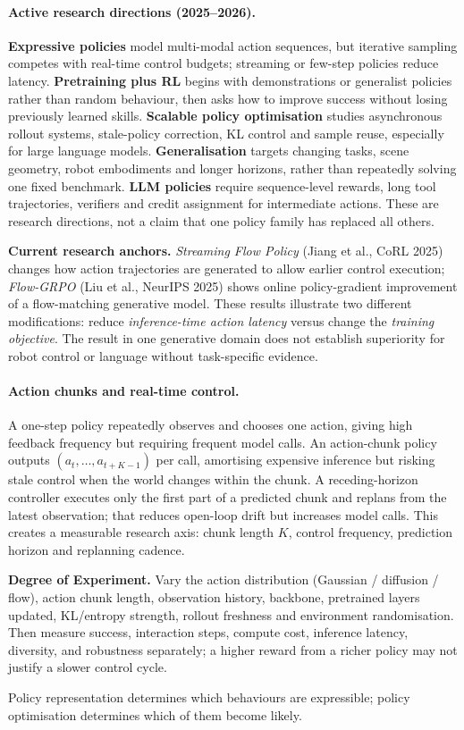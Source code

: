 \paragraph{Active research directions (2025--2026).}
\textbf{Expressive policies} model multi-modal action sequences, but iterative sampling competes with real-time control budgets; streaming or few-step policies reduce latency.
\textbf{Pretraining plus RL} begins with demonstrations or generalist policies rather than random behaviour, then asks how to improve success without losing previously learned skills.
\textbf{Scalable policy optimisation} studies asynchronous rollout systems, stale-policy correction, KL control and sample reuse, especially for large language models.
\textbf{Generalisation} targets changing tasks, scene geometry, robot embodiments and longer horizons, rather than repeatedly solving one fixed benchmark.
\textbf{LLM policies} require sequence-level rewards, long tool trajectories, verifiers and credit assignment for intermediate actions.
These are research directions, not a claim that one policy family has replaced all others.

\textbf{Current research anchors.} \emph{Streaming Flow Policy} (Jiang et al., CoRL 2025) changes how action trajectories are generated to allow earlier control execution; \emph{Flow-GRPO} (Liu et al., NeurIPS 2025) shows online policy-gradient improvement of a flow-matching generative model.
These results illustrate two different modifications: reduce \emph{inference-time action latency} versus change the \emph{training objective}.
The result in one generative domain does not establish superiority for robot control or language without task-specific evidence.
\paragraph{Action chunks and real-time control.}
A one-step policy repeatedly observes and chooses one action, giving high feedback frequency but requiring frequent model calls.
An action-chunk policy outputs $(a_t,\ldots,a_{t+K-1})$ per call, amortising expensive inference but risking stale control when the world changes within the chunk.
A receding-horizon controller executes only the first part of a predicted chunk and replans from the latest observation; that reduces open-loop drift but increases model calls.
This creates a measurable research axis: chunk length $K$, control frequency, prediction horizon and replanning cadence.

\textbf{Degree of Experiment.} Vary the action distribution (Gaussian / diffusion / flow), action chunk length, observation history, backbone, pretrained layers updated, KL/entropy strength, rollout freshness and environment randomisation.
Then measure success, interaction steps, compute cost, inference latency, diversity, and robustness separately; a higher reward from a richer policy may not justify a slower control cycle.
\begin{calloutintuition}
Policy representation determines which behaviours are expressible; policy optimisation determines which of them become likely.
\end{calloutintuition}

